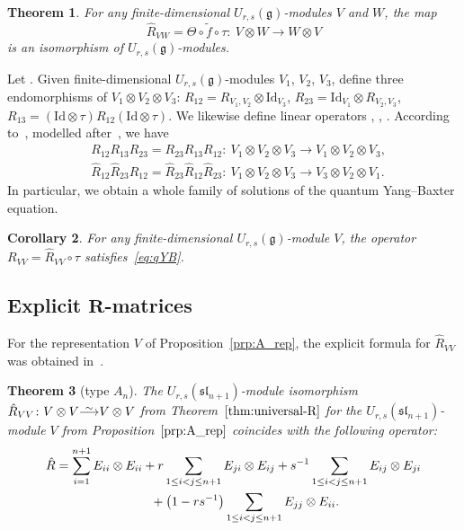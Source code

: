 \documentclass[pdftex]{sigma}
\numberwithin{equation}{section}
\newtheorem{Theorem}{Theorem}[section]
\newtheorem{Corollary}[Theorem]{Corollary}
\newcommand{\fg}{\mathfrak{g}}
\newcommand{\ssl}{\mathfrak{sl}}
\newcommand{\uu}{U_{r,s}(\fg)}
\newcommand\iso{ \vphantom{j^{X^2}}\smash{\overset{\sim}{\vphantom{\rule{0pt}{0.20em}}\smash{\longrightarrow}}} }
\begin{document}
\begin{Theorem}\label{thm:universal-R}
For any finite-dimensional $\uu$-modules $V$ and $W$, the map
\begin{equation}\label{eq:R-int}
 \hat{R}_{VW}=\Theta \circ \widetilde{f} \circ \tau\colon\ V \otimes W \to W \otimes V
\end{equation}
is an isomorphism of $\uu$-modules.
\end{Theorem}


Let . Given finite-dimensional $\uu$-modules $V_1$, $V_2$, $V_3$, define three endomorphisms of $V_1\otimes V_2\otimes V_3$: $R_{12}=R_{V_1,V_2}\otimes \mathrm{Id}_{V_3}$, $R_{23}=\mathrm{Id}_{V_1}\otimes R_{V_2,V_3}$, $R_{13}=(\mathrm{Id}\otimes \tau)R_{12}(\mathrm{Id}\otimes \tau)$. We likewise define linear operators , , . According to~\cite{BW1,BGH2}, modelled after~\cite{J}, we have
\begin{align}
 & R_{12} R_{13} R_{23} = R_{23} R_{13} R_{12}\colon\
 V_1\otimes V_2\otimes V_3 \to V_1\otimes V_2\otimes V_3,\nonumber \\
 & \hat{R}_{12} \hat{R}_{23} \hat{R}_{12} = \hat{R}_{23} \hat{R}_{12} \hat{R}_{23}\colon\
 V_1\otimes V_2\otimes V_3 \to V_3\otimes V_2\otimes V_1.\label{eq:qYB-two}
\end{align}
In particular, we obtain a whole family of solutions of the quantum Yang--Baxter equation.

\begin{Corollary}
For any finite-dimensional $\uu$-module $V$, the operator $R_{VV}=\hat{R}_{VV} \circ \tau$ satisfies~\eqref{eq:qYB}.
\end{Corollary}

\subsection[Explicit R-matrices]{Explicit $\boldsymbol{R}$-matrices}%

For the representation $V$ of Proposition~\ref{prp:A_rep}, the explicit formula for $\hat{R}_{VV}$ was obtained in~\cite[Sec\-tion~5]{BW2}.

\begin{Theorem}[type $A_{n}$]\label{thm:A_RMatrix}
The $U_{r,s}(\ssl_{n+1})$-module isomorphism $\hat{R}_{VV}\colon V \otimes V \iso V \otimes V$ from Theorem~$\ref{thm:universal-R}$ for the $U_{r,s}(\ssl_{n+1})$-module $V$ from Proposition~$\ref{prp:A_rep}$ coincides with the following operator:
\begin{gather}
 \hat{R} =
 \sum_{i=1}^{n+1} E_{ii} \otimes E_{ii}
 + r \sum_{1\leq i<j\leq n+1} E_{ji} \otimes E_{ij}+ s^{-1} \sum_{1\leq i<j\leq n+1} E_{ij} \otimes E_{ji}\nonumber\\
 \hphantom{\hat{R} =}{}
 + \bigl(1-rs^{-1}\bigr) \sum_{1\leq i<j\leq n+1} E_{jj} \otimes E_{ii} .\label{eq:A_RMatrix}
\end{gather}
\end{Theorem}
\end{document}
